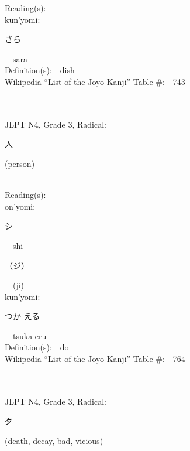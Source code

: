 \begin{multicols}{2}
Reading(s):\ \ \\
{\hspace*{1em}}kun'yomi:\ \ \\
{\hspace*{2em}}{\begin{CJK}{UTF8}{min} さら \end{CJK}}\ \ sara\ \ \\
Definition(s):\ \ dish \\
Wikipedia ``List of the J\=oy\=o Kanji'' Table \#:\ \ 743 \\
\ \ \\
{\fontsize{34pt}{40pt}  }\ \ \\  %
{JLPT N4, Grade 3, Radical:\ \ {\begin{CJK}{UTF8}{min} 人 \end{CJK}} (person) } \\
Reading(s):\ \ \\
{\hspace*{1em}}on'yomi:\ \ \\
{\hspace*{2em}}{\begin{CJK}{UTF8}{min} シ \end{CJK}}\ \ shi\ \ \\
{\hspace*{2em}}{\begin{CJK}{UTF8}{min} （ジ） \end{CJK}}\ \ (ji)\ \ \\
{\hspace*{1em}}kun'yomi:\ \ \\
{\hspace*{2em}}{\begin{CJK}{UTF8}{min} つか-える \end{CJK}}\ \ tsuka-eru\ \ \\
Definition(s):\ \ do \\
Wikipedia ``List of the J\=oy\=o Kanji'' Table \#:\ \ 764 \\
\ \ \\
{\fontsize{34pt}{40pt}  }\ \ \\  %
{JLPT N4, Grade 3, Radical:\ \ {\begin{CJK}{UTF8}{min} 歹 \end{CJK}} (death, decay, bad, vicious) } \\

\end{multicols}
